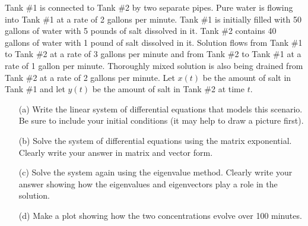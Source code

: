 \begin{problem}
    Tank \#1 is connected to Tank \#2 by two separate pipes.  Pure water is flowing
    into Tank \#1 at a rate of 2 gallons per minute.  Tank \#1 is initially filled with 50
    gallons of water with 5 pounds of salt dissolved in it.  Tank \#2 contains 40 gallons
    of water with 1 pound of salt dissolved in it.  Solution flows from Tank \#1 to Tank
    \#2 at a rate of 3 gallons per minute and from Tank \#2 to Tank \#1 at a rate of 1
    gallon per minute.  Thoroughly mixed solution is also being drained from Tank \#2 at a
    rate of 2 gallons per minute.  Let $x(t)$ be the amount of salt in Tank \#1 and let
    $y(t)$ be the amount of salt in Tank \#2 at time $t$.  
    \begin{enumerate}
        \item[(a)] Write the linear system of differential equations that models this
            scenario. Be sure to include your initial conditions (it may help to draw a
            picture first).
        \item[(b)] Solve the system of differential equations using the matrix
            exponential.  Clearly write your answer in matrix and  vector form.
        \item[(c)] Solve the system again using the eigenvalue method.  Clearly write your
            answer showing how the eigenvalues and eigenvectors play a role in the
            solution.
        \item[(d)] Make a plot showing how the two concentrations evolve over 100 minutes.
    \end{enumerate}
\end{problem}




